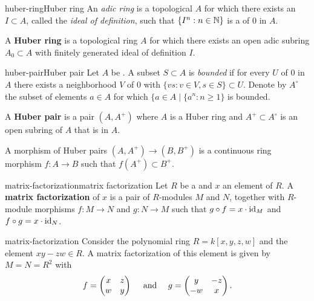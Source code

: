 \begin{topic}{huber-ring}{Huber ring}
    An \textit{adic ring} is a topological  $A$ for which there exists an  $I \subset A$, called the \textit{ideal of definition}, such that $\{ I^n : n \in \mathbb{N} \}$ is a  of $0$ in $A$.

    A \textbf{Huber ring} is a topological ring $A$ for which there exists an open adic subring $A_0 \subset A$ with finitely generated ideal of definition $I$.
\end{topic}

\begin{topic}{huber-pair}{Huber pair}
    Let $A$ be . A subset $S \subset A$ is \textit{bounded} if for every  $U$ of $0$ in $A$ there exists a neighborhood $V$ of $0$ with $\{ vs : v \in V, s \in S \} \subset U$. Denote by $A^\circ$ the subset of elements $a \in A$ for which $\{ a \in A \mid \{ a^n : n \ge 1 \}$ is bounded.

    A \textbf{Huber pair} is a pair $(A, A^+)$ where $A$ is a Huber ring and $A^+ \subset A^\circ$ is an open subring of $A$ that is  in $A$.

    A morphism of Huber pairs $(A, A^+) \to (B, B^+)$ is a continuous ring morphism $f : A \to B$ such that $f(A^+) \subset B^+$.
\end{topic}

\begin{topic}{matrix-factorization}{matrix factorization}
    Let $R$ be a  and $x$ an element of $R$. A \textbf{matrix factorization} of $x$ is a pair of  $R$-modules $M$ and $N$, together with $R$-module morphisms $f : M \to N$ and $g : N \to M$ such that $g \circ f = x \cdot \textup{id}_M$ and $f \circ g = x \cdot \textup{id}_N$.
\end{topic}

\begin{example}{matrix-factorization}
    Consider the polynomial ring $R = k[x, y, z, w]$ and the element $xy - zw \in R$. A matrix factorization of this element is given by $M = N = R^2$ with
    \[ f = \begin{pmatrix} x & z \\ w & y \end{pmatrix} \quad \textup{ and } \quad g = \begin{pmatrix} y & -z \\ -w & x \end{pmatrix} . \]
\end{example}

